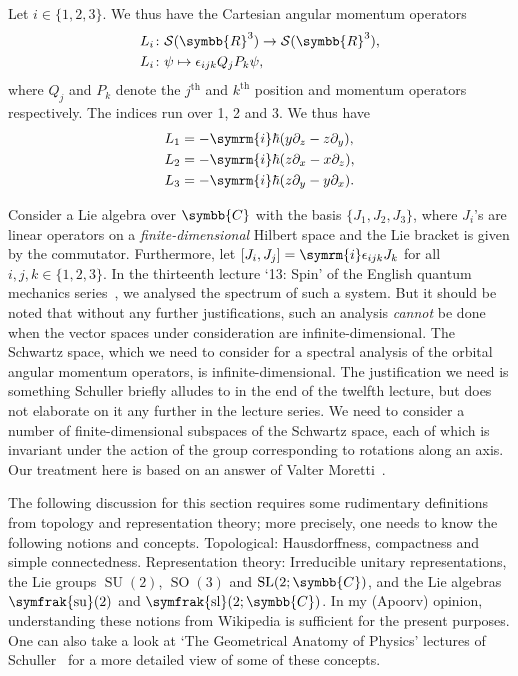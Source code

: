 \documentclass[12pt, a4 paper]{article}
\let\symcal\mathcal
\theoremstyle{definition}
\newcommand{\position}{Q}
\newcommand{\momentum}{P}
\newcommand{\rr}{\symbb{R}}
\newcommand{\cc}{\symbb{C}}
\newcommand{\schwartz}{\symcal{S}}
\newcommand{\schwartzrthree}{\schwartz(\rr^3)}
\renewcommand{\i}{\symrm{i}}
\newcommand{\levi}{\epsilon_{ijk}}
\newcommand{\sutwo}{\operatorname{\symfrak{su}}(2)}
\newcommand{\sltwoc}{\operatorname{\symfrak{sl}}(2;\cc)}
\newcommand{\SUtwo}{\operatorname{SU}(2)}
\newcommand{\SOthree}{\operatorname{SO}(3)}
\begin{document}
    Let $i \in \{1,2,3\}$. We thus have the Cartesian angular momentum operators
    \begin{align*}
        L_i &\colon \schwartzrthree \rightarrow \schwartzrthree,\\
        L_i &\colon \psi \mapsto \levi\position_j\momentum_k\psi,
    \end{align*}
    where $\position_j$ and $\momentum_k$ denote the $j^\text{th}$ and $k^\text{th}$ position and momentum operators respectively. The indices run over 1, 2 and 3.
    We thus have
    \begin{align*}
        L_1 &= -\i\hbar(y\partial_z - z\partial_y),\\
        L_2 &= -\i\hbar(z\partial_x - x\partial_z),\\
        L_3 &= -\i\hbar(z\partial_y - y\partial_x).
    \end{align*}

    Consider a Lie algebra over \(\cc\) with the basis \(\{J_1, J_2, J_3\}\), where \(J_i\)'s are linear operators on a \textit{finite-dimensional} Hilbert space and the Lie bracket is given by the commutator. Furthermore, let \([J_i, J_j] = \i \epsilon_{ijk} J_k\) for all \(i, j, k \in \{1, 2, 3\}\). In the thirteenth lecture `13: Spin' of the English quantum mechanics series~\cite{Schuller, SchullerVideos}, we analysed the spectrum of such a system. But it should be noted that without any further justifications, such an analysis \textit{cannot} be done when the vector spaces under consideration are infinite-dimensional. The Schwartz space, which we need to consider for a spectral analysis of the orbital angular momentum operators, is infinite-dimensional. The justification we need is something Schuller briefly alludes to in the end of the twelfth lecture, but does not elaborate on it any further in the lecture series. We need to consider a number of finite-dimensional subspaces of the Schwartz space, each of which is invariant under the action of the group corresponding to rotations along an axis. Our treatment here is based on an answer of Valter Moretti~\cite{MorettiPeter}.

    The following discussion for this section requires some rudimentary definitions from topology and representation theory; more precisely, one needs to know the following notions and concepts. Topological: Hausdorffness, compactness and simple connectedness. Representation theory: Irreducible unitary representations, the Lie groups \(\SUtwo\), \(\SOthree\) and \(\operatorname{SL}(2;\cc)\), and the Lie algebras \(\sutwo\) and \(\sltwoc\). In my (Apoorv) opinion, understanding these notions from Wikipedia is sufficient for the present purposes. One can also take a look at `The Geometrical Anatomy of Physics' lectures of Schuller~\cite{Schuller_geometric_videos, Schuller_geometric_notes} for a more detailed view of some of these concepts.
\end{document}
